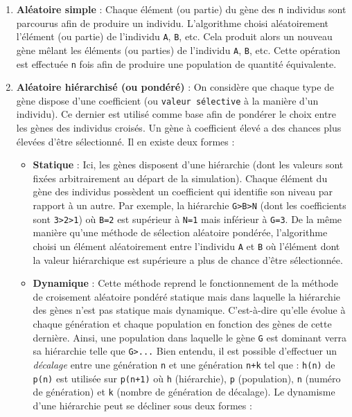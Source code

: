 \begin{enumerate}
\def\labelenumi{\arabic{enumi}.}
\tightlist
\item
  \textbf{Aléatoire simple} : Chaque élément (ou partie) du gène des
  \texttt{n} individus sont parcourus afin de produire un individu.
  L'algorithme choisi aléatoirement l'élément (ou partie) de l'individu
  \texttt{A}, \texttt{B}, etc. Cela produit alors un nouveau gène mêlant
  les éléments (ou parties) de l'individu \texttt{A}, \texttt{B}, etc.
  Cette opération est effectuée \texttt{n} fois afin de produire une
  population de quantité équivalente.
\item
  \textbf{Aléatoire hiérarchisé (ou pondéré)} : On considère que chaque
  type de gène dispose d'une coefficient (ou \texttt{valeur\ sélective}
  à la manière d'un individu). Ce dernier est utilisé comme base afin de
  pondérer le choix entre les gènes des individus croisés. Un gène à
  coefficient élevé a des chances plus élevées d'être sélectionné. Il en
  existe deux formes :

  \begin{itemize}
  \tightlist
  \item
    \textbf{Statique} : Ici, les gènes disposent d'une hiérarchie (dont
    les valeurs sont fixées arbitrairement au départ de la simulation).
    Chaque élément du gène des individus possèdent un coefficient qui
    identifie son niveau par rapport à un autre. Par exemple, la
    hiérarchie \texttt{G\textgreater{}B\textgreater{}N} (dont les
    coefficients sont \texttt{3\textgreater{}2\textgreater{}1}) où
    \texttt{B=2} est supérieur à \texttt{N=1} mais inférieur à
    \texttt{G=3}. De la même manière qu'une méthode de sélection
    aléatoire pondérée, l'algorithme choisi un élément aléatoirement
    entre l'individu \texttt{A} et \texttt{B} où l'élément dont la
    valeur hiérarchique est supérieure a plus de chance d'être
    sélectionnée.
  \item
    \textbf{Dynamique} : Cette méthode reprend le fonctionnement de la
    méthode de croisement aléatoire pondéré statique mais dans laquelle
    la hiérarchie des gènes n'est pas statique mais dynamique.
    C'est-à-dire qu'elle évolue à chaque génération et chaque population
    en fonction des gènes de cette dernière. Ainsi, une population dans
    laquelle le gène \texttt{G} est dominant verra sa hiérarchie telle
    que \texttt{G\textgreater{}...} Bien entendu, il est possible
    d'effectuer un \emph{décalage} entre une génération \texttt{n} et
    une génération \texttt{n+k} tel que : \texttt{h(n)} de \texttt{p(n)}
    est utilisée sur \texttt{p(n+1)} où \texttt{h} (hiérarchie),
    \texttt{p} (population), \texttt{n} (numéro de génération) et
    \texttt{k} (nombre de génération de décalage). Le dynamisme d'une
    hiérarchie peut se décliner sous deux formes :


\end{itemize}
\end{enumerate}
